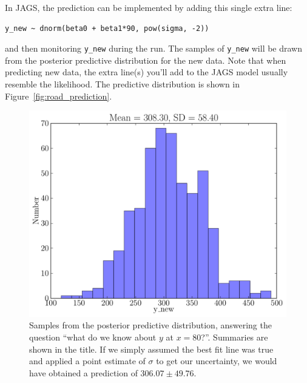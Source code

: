 In JAGS, the prediction can be implemented by adding this single extra line:
\begin{framed}
\begin{verbatim}
y_new ~ dnorm(beta0 + beta1*90, pow(sigma, -2))
\end{verbatim}
\end{framed}
and then monitoring {\tt y\_new} during the run. The samples of {\tt y\_new}
will be drawn from the posterior predictive distribution for the new data.
Note that when predicting new data, the extra line(s) you'll add to the JAGS
model usually resemble the likelihood. The predictive distribution is shown in
Figure~\ref{fig:road_prediction}.
\begin{figure}[ht!]
\begin{center}
\includegraphics[scale=0.5]{Figures/road_prediction.pdf}
\caption{Samples from the posterior predictive distribution, answering the
question ``what do we know about $y$ at $x=80$?''. Summaries are shown in
the title. If we simply assumed the best fit line was true and applied a
point estimate of $\sigma$ to get our uncertainty, we would have obtained a
prediction of $306.07 \pm 49.76$.}
\end{center}
\end{figure}

